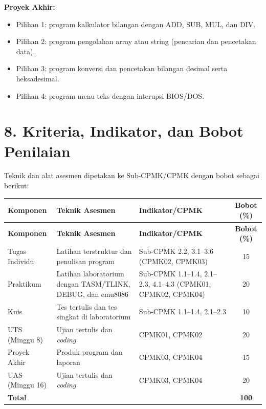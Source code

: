 \documentclass[12pt,a4paper]{article}
\begin{document}
\textbf{Proyek Akhir:}
\begin{itemize}[leftmargin=*]
  \item Pilihan 1: program kalkulator bilangan dengan ADD, SUB, MUL, dan DIV.
  \item Pilihan 2: program pengolahan array atau string (pencarian dan pencetakan data).
  \item Pilihan 3: program konversi dan pencetakan bilangan desimal serta heksadesimal.
  \item Pilihan 4: program menu teks dengan interupsi BIOS/DOS.
\end{itemize}

\vspace{0.5cm}

\section*{8. Kriteria, Indikator, dan Bobot Penilaian}

Teknik dan alat asesmen dipetakan ke Sub-CPMK/CPMK dengan bobot sebagai berikut:

\begin{longtable}{|>{\raggedright\arraybackslash}p{2.4cm}|>{\raggedright\arraybackslash}p{3.2cm}|>{\raggedright\arraybackslash}p{5.2cm}|c|}
\hline
\textbf{Komponen} & \textbf{Teknik Asesmen} & \textbf{Indikator/CPMK} & \textbf{Bobot (\%)} \\
\hline
\endfirsthead
\hline
\textbf{Komponen} & \textbf{Teknik Asesmen} & \textbf{Indikator/CPMK} & \textbf{Bobot (\%)} \\
\hline
\endhead
\hline
\endfoot

Tugas Individu & Latihan terstruktur dan penulisan program & Sub-CPMK 2.2, 3.1--3.6 (CPMK02, CPMK03) & 15 \\
\hline
Praktikum & Latihan laboratorium dengan TASM/TLINK, DEBUG, dan emu8086 & Sub-CPMK 1.1--1.4, 2.1--2.3, 4.1--4.3 (CPMK01, CPMK02, CPMK04) & 20 \\
\hline
Kuis & Tes tertulis dan tes singkat di laboratorium & Sub-CPMK 1.1--1.4, 2.1--2.3 & 10 \\
\hline
UTS (Minggu 8) & Ujian tertulis dan \textit{coding} & CPMK01, CPMK02 & 20 \\
\hline
Proyek Akhir & Produk program dan laporan & CPMK03, CPMK04 & 15 \\
\hline
UAS (Minggu 16) & Ujian tertulis dan \textit{coding} & CPMK03, CPMK04 & 20 \\
\hline
\textbf{Total} & & & \textbf{100} \\
\hline
\end{longtable}
\end{document}
